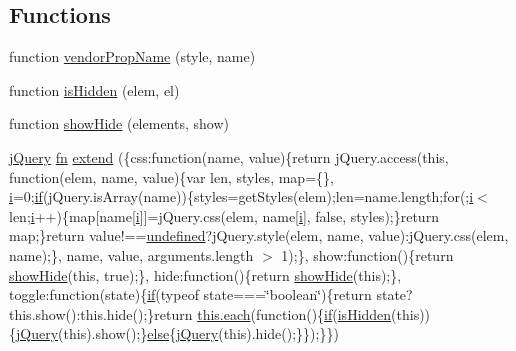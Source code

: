 \subsection*{Functions}
\begin{DoxyCompactItemize}
\item 
function \hyperlink{obj_2_release_2_package_2_package_tmp_2_scripts_2jquery-1_810_82_8js_a6a111234d6e26ce833f8fabd50819b7a}{vendor\+Prop\+Name} (style, name)
\item 
function \hyperlink{obj_2_release_2_package_2_package_tmp_2_scripts_2jquery-1_810_82_8js_a67ed58d688ff11991ca2826ebfbf28a4}{is\+Hidden} (elem, el)
\item 
function \hyperlink{obj_2_release_2_package_2_package_tmp_2_scripts_2jquery-1_810_82_8js_a002b8e481f3ab2a83194366aceb7a706}{show\+Hide} (elements, show)
\item 
\hyperlink{_scripts_2jquery-1_810_82_8js_a41c2e1bff4a6b292938143764e31d789}{j\+Query} \hyperlink{_scripts_2jquery-1_810_82_8min_8js_a37b9e1ceee4c6d2616fa6081784b5468}{fn} \hyperlink{obj_2_release_2_package_2_package_tmp_2_scripts_2jquery-1_810_82_8js_a23e2461f04a4f08dd7cba41707f8b9fa}{extend} (\{css\+:function(name, value)\{return j\+Query.\+access(this, function(elem, name, value)\{var len, styles, map=\{\}, \hyperlink{_scripts_2respond_8min_8js_a5e25b1d1bed9ab5f3174b76d6a722180}{i}=0;\hyperlink{_scripts_2respond_8min_8js_a93851d60dd037a83509a1757b9ee7b66}{if}(j\+Query.\+is\+Array(name))\{styles=get\+Styles(elem);len=name.\+length;for(;\hyperlink{_scripts_2respond_8min_8js_a5e25b1d1bed9ab5f3174b76d6a722180}{i}$<$ len;\hyperlink{_scripts_2respond_8min_8js_a5e25b1d1bed9ab5f3174b76d6a722180}{i}++)\{map\mbox{[}name\mbox{[}\hyperlink{_scripts_2respond_8min_8js_a5e25b1d1bed9ab5f3174b76d6a722180}{i}\mbox{]}\mbox{]}=j\+Query.\+css(elem, name\mbox{[}\hyperlink{_scripts_2respond_8min_8js_a5e25b1d1bed9ab5f3174b76d6a722180}{i}\mbox{]}, false, styles);\}return map;\}return value!==\hyperlink{_scripts_2jquery-1_810_82_8js_a08113a236cc18d2a9d5ce27e638012be}{undefined}?j\+Query.\+style(elem, name, value)\+:j\+Query.\+css(elem, name);\}, name, value, arguments.\+length $>$ 1);\}, show\+:function()\{return \hyperlink{_scripts_2jquery-1_810_82_8js_a002b8e481f3ab2a83194366aceb7a706}{show\+Hide}(this, true);\}, hide\+:function()\{return \hyperlink{_scripts_2jquery-1_810_82_8js_a002b8e481f3ab2a83194366aceb7a706}{show\+Hide}(this);\}, toggle\+:function(state)\{\hyperlink{_scripts_2respond_8min_8js_a93851d60dd037a83509a1757b9ee7b66}{if}(typeof state===\char`\"{}boolean\char`\"{})\{return state?this.\+show()\+:this.\+hide();\}return \hyperlink{_scripts_2jquery-1_810_82_8min_8js_af24c9ea1e34372f8c8b312b35586008d}{this.\+each}(function()\{\hyperlink{_scripts_2respond_8min_8js_a93851d60dd037a83509a1757b9ee7b66}{if}(\hyperlink{_scripts_2jquery-1_810_82_8js_a67ed58d688ff11991ca2826ebfbf28a4}{is\+Hidden}(this))\{\hyperlink{_scripts_2jquery-1_810_82_8js_a41c2e1bff4a6b292938143764e31d789}{j\+Query}(this).show();\}\hyperlink{_scripts_2jquery_8validate_8js_a0544c3fe466e421738dae463968b70ba}{else}\{\hyperlink{_scripts_2jquery-1_810_82_8js_a41c2e1bff4a6b292938143764e31d789}{j\+Query}(this).hide();\}\});\}\})

\end{DoxyCompactItemize}

